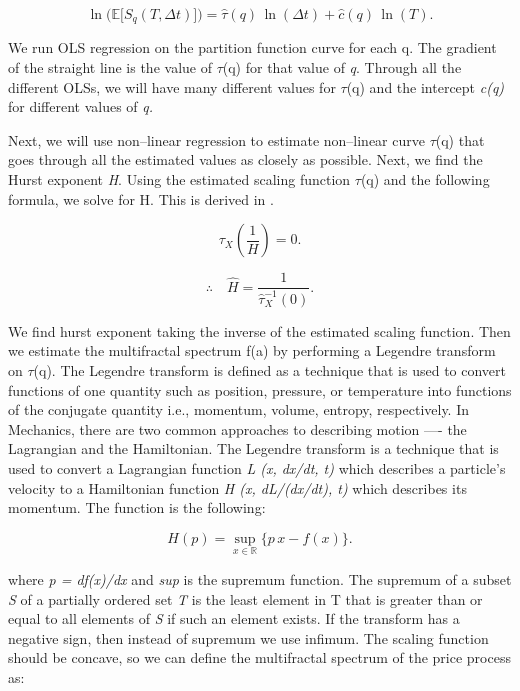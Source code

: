\documentclass[12pt,a4paper]{report}
\numberwithin{equation}{section}
\begin{document}
\begin{equation}\label{eq:3.1.7}
\ln\!\Big(\mathbb{E}\big[S_q(T,\Delta t)\big]\Big)
= \widehat{\tau}(q)\,\ln(\Delta t) + \widehat{c}(q)\,\ln(T).
\end{equation}


We run OLS regression on the partition function curve for each q. The
gradient of the straight line is the value of $\tau$(q) for that value of
\emph{q}. Through all the different OLSs, we will have many different
values for $\tau$(q) and the intercept \emph{c(q)} for different values of
\emph{q.}

Next, we will use non--linear regression to estimate non--linear curve
$\tau$(q) that goes through all the estimated values as closely as possible.
Next, we find the Hurst exponent \emph{H}. Using the estimated scaling
function $\tau$(q) and the following formula, we solve for H. This is derived
in \cite{mandelbrot1997multifractal_13}.

\begin{equation}\label{eq:3.1.8}
\tau_X\!\left(\frac{1}{H}\right)=0 .
\end{equation}

\begin{equation}\label{eq:3.1.9}
\therefore\quad \widehat{H}
= \frac{1}{\widehat{\tau}_X^{-1}(0)} .
\end{equation}

We find hurst exponent taking the inverse of the estimated scaling
function. Then we estimate the multifractal spectrum f(a) by performing
a Legendre transform on $\tau$(q). The Legendre transform is defined as a
technique that is used to convert functions of one quantity such as
position, pressure, or temperature into functions of the conjugate
quantity i.e., momentum, volume, entropy, respectively. In Mechanics,
there are two common approaches to describing motion ---- the Lagrangian
and the Hamiltonian. The Legendre transform is a technique that is used
to convert a Lagrangian function \emph{L (x, dx/dt, t)} which describes
a particle's velocity to a Hamiltonian function \emph{H (x, dL/(dx/dt),
t)} which describes its momentum. The function is the following:

\begin{equation}\label{eq:3.1.9}
H(p)=\sup_{x\in\mathbb{R}}\bigl\{p\,x - f(x)\bigr\}.
\end{equation}


where \emph{p = df(x)/dx} and \emph{sup} is the supremum function. The
supremum of a subset \emph{S} of a partially ordered set \emph{T} is the
least element in T that is greater than or equal to all elements of
\emph{S} if such an element exists. If the transform has a negative
sign, then instead of supremum we use infimum. The scaling function
should be concave, so we can define the multifractal spectrum of the
price process as:
\end{document}
